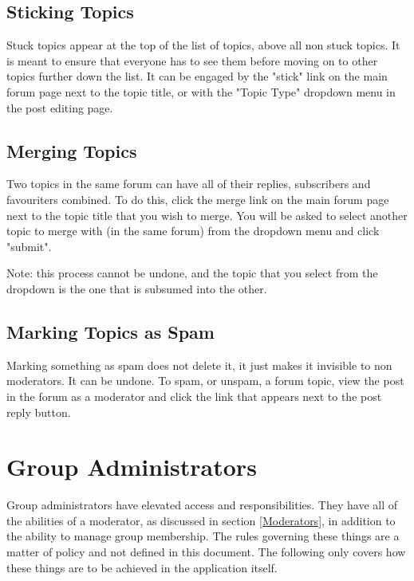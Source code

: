 \documentclass[10pt]{article}
\begin{document}
\subsection{Sticking Topics}
\begin{flushleft}
Stuck topics appear at the top of the list of topics, above all non stuck topics.  It is meant to ensure that everyone has to see them before moving on to other topics further down the list.  It can be engaged by the "stick" link on the main forum page next to the topic title, or with the "Topic Type" dropdown menu in the post editing page.
\end{flushleft}

\subsection{Merging Topics}
\begin{flushleft}
Two topics in the same forum can have all of their replies, subscribers and favouriters combined.  To do this, click the merge link on the main forum page next to the topic title that you wish to merge.  You will be asked to select another topic to merge with (in the same forum) from the dropdown menu and click "submit". 
\end{flushleft}

\begin{flushleft}
Note: this process cannot be undone, and the topic that you select from the dropdown is the one that is subsumed into the other. 
\end{flushleft}

\subsection{Marking Topics as Spam}

\begin{flushleft}
Marking something as spam does not delete it, it just makes it invisible to non moderators.  It can be undone.  To spam, or unspam, a forum topic, view the post in the forum as a moderator and click the link that appears next to the post reply button.
\end{flushleft}




\section{Group Administrators}
Group administrators have elevated access and responsibilities.  They have all of the abilities of a moderator, as discussed in section \ref{Moderators}, in addition to the ability to manage group membership.  The rules governing these things are a matter of policy and not defined in this document.  The following only covers how these things are to be achieved in the application itself. 
\end{document}
